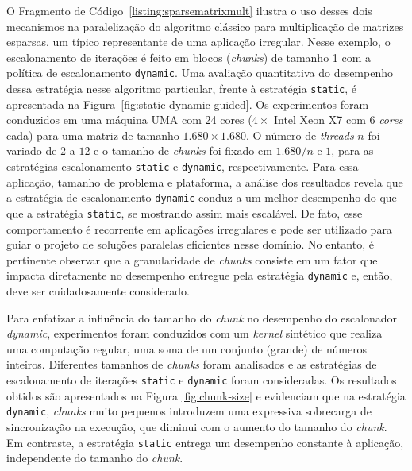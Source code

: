 \documentclass{SBCbookchapter}
\begin{document}
		O Fragmento de Código~\ref{listing:sparsematrixmult} ilustra o
		uso desses dois mecanismos na paralelização do algoritmo
		clássico para multiplicação de matrizes esparsas, um típico
		representante de uma aplicação irregular. Nesse exemplo, o
		escalonamento de iterações é feito em blocos (\textit{chunks})
		de tamanho 1 com a política de escalonamento \texttt{dynamic}.
		Uma avaliação quantitativa do desempenho dessa estratégia nesse
		algoritmo particular, frente à estratégia \texttt{static}, é
		apresentada na Figura~\ref{fig:static-dynamic-guided}. Os
		experimentos foram conduzidos em uma máquina UMA com 24 cores
		($4 \times$ Intel Xeon X7 com 6 \textit{cores} cada) para uma
		matriz de tamanho $1.680 \times 1.680$.  O número de
		\textit{threads} $n$ foi variado de $2$ a $12$ e o tamanho de
		\textit{chunks} foi fixado em $1.680/n$ e $1$, para as
		estratégias escalonamento \texttt{static} e \texttt{dynamic},
		respectivamente.  Para essa aplicação, tamanho de problema e
		plataforma, a análise dos resultados revela que a estratégia de
		escalonamento \texttt{dynamic} conduz a um melhor desempenho do
		que que a estratégia \texttt{static}, se mostrando assim mais
		escalável.  De fato, esse comportamento é recorrente em
		aplicações irregulares e pode ser utilizado para guiar o projeto
		de soluções paralelas eficientes nesse domínio. No entanto, é
		pertinente observar que a granularidade de \textit{chunks}
		consiste em um fator que impacta diretamente no desempenho
		entregue pela estratégia \texttt{dynamic} e, então, deve ser
		cuidadosamente considerado. 

		Para enfatizar a influência do tamanho do \textit{chunk} no
		desempenho do escalonador \textit{dynamic}, experimentos foram
		conduzidos com um \textit{kernel} sintético que realiza uma
		computação regular, uma soma de um conjunto (grande) de números
		inteiros. Diferentes tamanhos de \textit{chunks} foram
		analisados e as estratégias de escalonamento de iterações
		\texttt{static} e \texttt{dynamic} foram consideradas. Os
		resultados obtidos são apresentados na Figura
		\ref{fig:chunk-size} e evidenciam que na estratégia
		\texttt{dynamic}, \textit{chunks} muito pequenos introduzem uma
		expressiva sobrecarga de sincronização na execução, que diminui
		com o aumento do tamanho do \textit{chunk}. Em contraste, a
		estratégia \texttt{static} entrega um desempenho constante à
		aplicação, independente do tamanho do \textit{chunk}.
\end{document}
